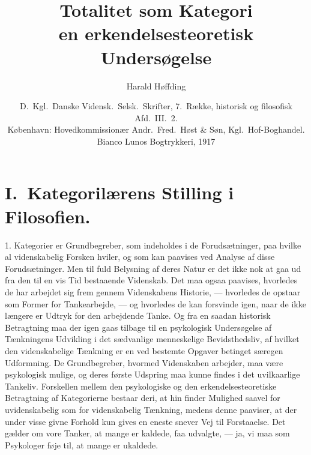 \documentclass[12pt]{article}
\title{\textbf{Totalitet som Kategori}\\[0.5em]
  \large en erkendelsesteoretisk Undersøgelse}
\author{Harald Høffding}
\date{D.\ Kgl.\ Danske Vidensk.\ Selsk.\ Skrifter, 7.\ Række,
  historisk og filosofisk Afd.\ III.\ 2.\\
  København: Hovedkommissionær Andr.\ Fred.\ Høst \& Søn,
  Kgl.\ Hof-Boghandel.\\ Bianco Lunos Bogtrykkeri, 1917}
\newcommand{\opage}[1]{\marginnote{\footnotesize\textit{[#1]}}}
\begin{document}
\maketitle
\tableofcontents
\bigskip

\section*{I.\ Kategorilærens Stilling i Filosofien.}

\opage{3}1. Kategorier er Grundbegreber, som indeholdes i de Forudsætninger, paa
hvilke al videnskabelig Forsken hviler, og som kan paavises ved Analyse af disse
Forudsætninger. Men til fuld Belysning af deres Natur er det ikke nok at gaa ud
fra den til en vis Tid bestaaende Videnskab. Det maa ogsaa paavises, hvorledes
de har arbejdet sig frem gennem Videnskabens Historie, --- hvorledes de opstaar
som Former for Tankearbejde, --- og hvorledes de kan forsvinde igen, naar de ikke
længere er Udtryk for den arbejdende Tanke. Og fra en saadan historisk
Betragtning maa der igen gaas tilbage til en psykologisk Undersøgelse af
Tænkningens Udvikling i det sædvanlige menneskelige Bevidsthedsliv, af hvilket
den videnskabelige
Tænkning er en ved bestemte Opgaver betinget særegen Udformning. De
Grundbegreber, hvormed Videnskaben arbejder, maa være psykologisk mulige, og
deres første Udspring maa kunne findes i det uvilkaarlige Tankeliv. Forskellen
mellem den psykologiske og den erkendelsesteoretiske Betragtning af Kategorierne
bestaar deri, at hin finder Mulighed saavel for uvidenskabelig som for
videnskabelig Tænkning, medens denne paaviser, at der under visse givne Forhold
kun gives en eneste snever Vej til Forstaaelse. Det gælder om vore Tanker, at
mange er kaldede, faa udvalgte, --- ja, vi maa som Psykologer føje til, at mange
er ukaldede.
\end{document}

